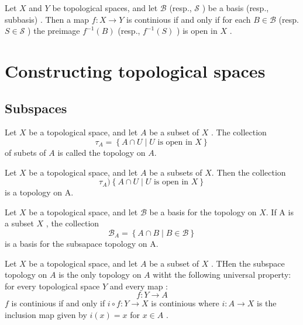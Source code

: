 \documentclass{article}
\theoremstyle{remark}
\begin{document}
\begin{theorem}
    Let $X$ and $Y$ be topological spaces, and let $ \mathscr{B} $ (resp., $\mathscr{S} $ ) be a basis (resp.,
    subbasis) . Then a map $f: X \to Y  $ is continious if and only if for each $B \in \mathscr{B} $ (resp. $S \in
    \mathscr{S} $ ) the preimage $f^{-1} \left( B \right)$ (resp., $f^{-1} \left( S \right)$ ) is open in $X$   .
\end{theorem}

\section{ Constructing topological spaces}%
\label{sec:chapter_5_constructing_topological_spaces}

\subsection{Subspaces}%
\label{sub:subspaces}

\begin{definition}
    Let $X$ be a topological space, and let $A$ be a subset of $X$ . The collection \[
    \tau _{A} = \left\{ A \cap U  \mid   U \text{ is open in }X  \right\}
    \]
    of subets of $A$ is called the topology on $A$.
\end{definition}

\begin{lemma}
    Let $X$  be a topological space, and let $A$  be a subsets of $X$. Then the collection \[
        \tau _{A} ) \left\{ A \cap  U   \mid  U \text{ is open in }X \right\}
    \]
    is a topology on A.
\end{lemma}

\begin{theorem}
    Let $X$ be a topological space, and let $\mathscr{B} $  be a basis for the topology on $X$. If A is a subset $X$ ,
    the collection \[
    \mathscr{B} _{A} = \left\{ A \cap  B  \mid  B \in \mathscr{B}  \right\}
    \]
    is a basis for the subsapace topology on A.
\end{theorem}

\begin{theorem}
    Let $X$  be a topological space, and let $A$ be a subset of $X$ . THen the subspace topology on $A$  is the only
    topology on $A$  witht the following universal property: for every topological space $Y$ and every map : \[
    f: Y \to A
    \]
    $f$ is continious if and only if $i \circ  f: Y \to X$  is continious where $i : A \to X$ is the inclusion map given
    by $i\left( x \right) = x$  for $x \in  A$ .

\end{theorem}
\end{document}
